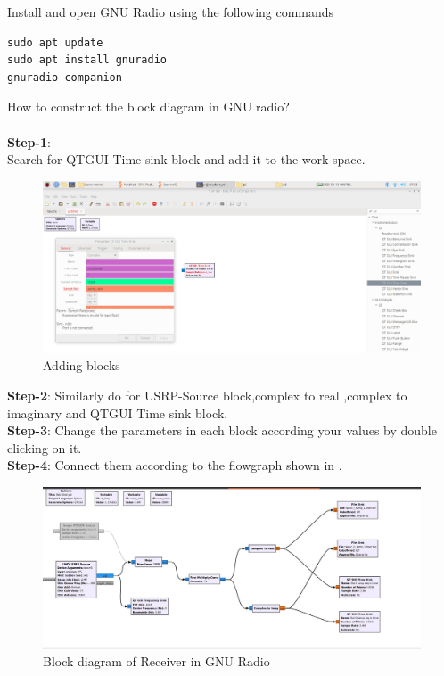  Install and open GNU Radio using the following commands
\\
\begin{lstlisting}
sudo apt update
sudo apt install gnuradio
gnuradio-companion
\end{lstlisting}
 How to construct the block diagram in GNU radio? \\
	\solution  \\
\textbf{Step-1}:\\
Search for QTGUI Time sink  block and add it to the work space.
\begin{figure}[H]
\centering
\includegraphics[width=\columnwidth]{figs/add.png}
\caption{Adding blocks}
\label{fig:adding blocks}
\end{figure}
\textbf{Step-2}:
Similarly do for USRP-Source block,complex to real ,complex to imaginary and QTGUI Time sink block.
\\
\textbf{Step-3}:
Change the parameters in each block according your values by double clicking on it.
\\
\textbf{Step-4}:
Connect them according to the flowgraph shown in .
\begin{figure}[H]
\centering
\includegraphics[width=\columnwidth]{figs/USRP_navic.jpg}
\caption{Block diagram of Receiver in GNU Radio}
\label{fig:Rx_Block_diagram_USRP}
\end{figure}
